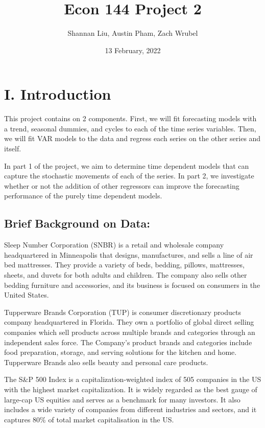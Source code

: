 \documentclass[
  10.5pt,
]{article}
\title{Econ 144 Project 2}
\author{Shannan Liu, Austin Pham, Zach Wrubel}
\date{13 February, 2022}
\begin{document}
\maketitle

{
\setcounter{tocdepth}{2}
\tableofcontents
}
\newpage

\hypertarget{i.-introduction}{%
\section{I. Introduction}\label{i.-introduction}}

This project contains on 2 components. First, we will fit forecasting
models with a trend, seasonal dummies, and cycles to each of the time
series variables. Then, we will fit VAR models to the data and regress
each series on the other series and itself.

In part 1 of the project, we aim to determine time dependent models that
can capture the stochastic movements of each of the series. In part 2,
we investigate whether or not the addition of other regressors can
improve the forecasting performance of the purely time dependent models.

\hypertarget{brief-background-on-data}{%
\subsection{Brief Background on Data:}\label{brief-background-on-data}}

Sleep Number Corporation (SNBR) is a retail and wholesale company
headquartered in Minneapolis that designs, manufactures, and sells a
line of air bed mattresses. They provide a variety of beds, bedding,
pillows, mattresses, sheets, and duvets for both adults and children.
The company also sells other bedding furniture and accessories, and its
business is focused on consumers in the United States.

Tupperware Brands Corporation (TUP) is consumer discretionary products
company headquartered in Florida. They own a portfolio of global direct
selling companies which sell products across multiple brands and
categories through an independent sales force. The Company's product
brands and categories include food preparation, storage, and serving
solutions for the kitchen and home. Tupperware Brands also sells beauty
and personal care products.

The S\&P 500 Index is a capitalization-weighted index of 505 companies
in the US with the highest market capitalization. It is widely regarded
as the best gauge of large-cap US equities and serves as a benchmark for
many investors. It also includes a wide variety of companies from
different industries and sectors, and it captures 80\% of total market
capitalisation in the US.
\end{document}
